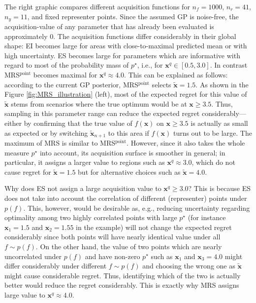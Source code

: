 \documentclass[10pt,letterpaper]{article} %
\begin{document}
The right graphic compares different acquisition functions for $n_f = 1000$,
$n_r=41$, $n_y = 11$, and fixed representer points.  Since the assumed GP is noise-free, the
acquisition-value of any parameter that has already been evaluated is approximately $0$.  The acquisition functions differ considerably in
their global shape: EI becomes large for areas with close-to-maximal predicted mean or with high uncertainty.
 ES becomes large for parameters which are informative with regard to most of the
probability mass of $p^\star$, i.e., for $\mathbf{x}^q \in [0.5, 3.0]$.  In contrast
MRS$^\text{point}$ becomes maximal for $\mathbf{x}^q \approx 4.0$. This can be
explained as follows: according to the current GP posterior, MRS$^\text{point}$ selects $\mathbf{\tilde x} = 1.5$. As shown in the Figure \ref{fig:MRS_illustration} (left),
most of the expected regret for this value of $\mathbf{\tilde x}$ stems from scenarios
where the true optimum would be at $\mathbf{x} \geq 3.5$. Thus, sampling in this
parameter range can reduce the expected regret considerably---either by confirming that the true value of $f(\mathbf{x})$ on $\mathbf{x} \geq 3.5$ is actually as small as expected or by switching $\mathbf{\tilde x}_{n+1}$ to this area if $f(\mathbf{x})$ turns out to be large. The maximum of MRS
is similar to MRS$^\text{point}$. However, since it also takes the whole measure
$p^\star$ into account, its acquisition surface is smoother in general; in particular, it assigns a larger value to regions such as $\mathbf{x}^q
\approx 3.0$, which do not cause regret for $\mathbf{\tilde x} = 1.5$ but for
alternative choices such as $\mathbf{\tilde x} = 4.0$.

Why does ES not assign a large acquisition value to $\mathbf{x}^q \geq 3.0$?
This is because ES does not take into account the correlation of different
(representer) points under $p(f)$. This, however, would be desirable as, e.g.,
reducing uncertainty regarding optimality among two highly correlated points
with large $p^\star$ (for instance $\mathbf{x}_1 = 1.5$ and $\mathbf{x}_2 =
1.55$ in the example) will not change the expected regret considerably since
both points will have nearly identical value under all $f \sim p(f)$. On the
other hand, the value of two points which are nearly uncorrelated under $p(f)$ and have non-zero $p^\star$ such as
$\mathbf{x}_1$ and $\mathbf{x}_3 = 4.0$ might differ considerably under
different $f \sim p(f)$ and choosing the wrong one as $\mathbf{\tilde x}$ might
cause considerable regret. Thus, identifying which of the two is actually
better would reduce the regret considerably. This is exactly why MRS assigns large value to $\mathbf{x}^q \approx 4.0$.
\end{document}
